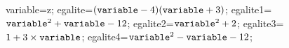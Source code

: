 \documentclass[exercice]{thedocument}%
\begin{document}
%
    \>variable=z;%
    \>egalite={$(\<variable;-4)(\<variable;+3)$};%
    \>egalite1=${\<variable;^2}+{\<variable;}-12$;%
    \>egalite2=${\<variable;}^2+2$;%
    \>egalite3=$1+3\times{\<variable;}$;%
    \>egalite4=${\<variable;^2}-{\<variable;}-12$;%
\end{document}
